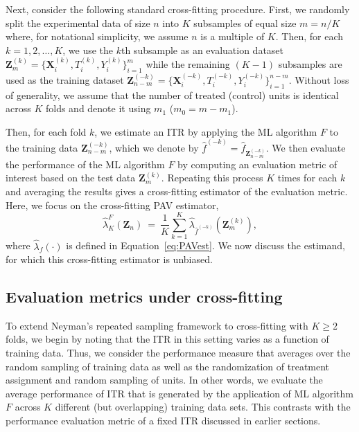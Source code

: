 \documentclass[USenglish,onecolumn]{article}
\newcommand\cZ{\mathcal{Z}}
\newcommand\bX{\bm{X}}
\newcommand\bZ{\bm{Z}}
\begin{document}
Next, consider the following standard cross-fitting procedure.  First,
we randomly split the experimental data of size $n$ into $K$
subsamples of equal size $m = n/K$ where, for notational simplicity,
we assume $n$ is a multiple of $K$.  Then, for each $k=1,2,\ldots,K$,
we use the $k$th subsample as an evaluation dataset
$\bZ_m^{(k)}=\{\bX_i^{(k)}, T_i^{(k)}, Y_i^{(k)}\}_{i=1}^{m}$ while
the remaining $(K-1)$ subsamples are used as the training dataset
$\bZ_{n-m}^{(-k)}=\{\bX_i^{(-k)}, T_i^{(-k)},
Y_i^{(-k)}\}_{i=1}^{n-m}$.  Without loss of generality, we assume that
the number of treated (control) units is identical across $K$ folds
and denote it using $m_1$ ($m_0=m-m_1$).

Then, for each fold $k$, we estimate an ITR by applying the ML
algorithm $F$ to the training data $\bZ_{n-m}^{(-k)}$, which we denote
by $\hat{f}^{(-k)}=\hat{f}_{\bZ_{n-m}^{(-k)}}$.  We then evaluate the
performance of the ML algorithm $F$ by computing an evaluation metric
of interest based on the test data $\bZ_m^{(k)}$.  Repeating this
process $K$ times for each $k$ and averaging the results gives a
cross-fitting estimator of the evaluation metric.  Here, we focus on
the cross-fitting PAV estimator,
\begin{equation}
  \hat{\lambda}_{K}^F(\bZ_n) \ = \ \frac{1}{K}\sum_{k=1}^K \hat{\lambda}_{\hat{f}^{(-k)}}(\bZ_m^{(k)}), \label{eq:PAVcvest}
\end{equation}
where $\hat\lambda_f(\cdot)$ is defined in Equation~\eqref{eq:PAVest}.
We now discuss the estimand, for which this cross-fitting estimator is
unbiased.

\subsection{Evaluation metrics under cross-fitting}

To extend Neyman's repeated sampling framework to cross-fitting with
$K \ge 2$ folds, we begin by noting that the ITR in this setting
varies as a function of training data.  Thus, we consider the
performance measure that averages over the random sampling of training
data as well as the randomization of treatment assignment and random
sampling of units.  In other words, we evaluate the average
performance of ITR that is generated by the application of ML
algorithm $F$ across $K$ different (but overlapping) training data
sets.  This contrasts with the performance evaluation metric of a
fixed ITR discussed in earlier sections.
\end{document}
